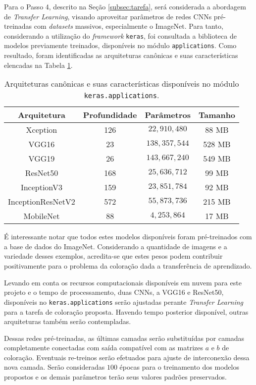 Para o Passo 4, descrito na Seção \ref{subsec:tarefa}, será considerada a abordagem de \emph{Transfer Learning}, visando aproveitar parâmetros de redes CNNs pré-treinadas com \emph{datasets} massivos, especialmente o ImageNet. Para tanto, considerando a utilização do \emph{framework} \texttt{keras}, foi consultada a biblioteca de modelos previamente treinados, disponíveis no módulo \texttt{applications}. Como resultado, foram identificadas as arquiteturas canônicas e suas características elencadas na Tabela \ref{tab:cnns}.

\begin{table}[!ht]
	\caption{Arquiteturas canônicas e suas características disponíveis no módulo \texttt{keras.applications}.}
	\centering
	\begin{tabular}{c c c c}
		\toprule
		 Arquitetura & Profundidade & Parâmetros & Tamanho \\
		\midrule
		Xception & 126 & $22,910,480$ & 88 MB \\
		VGG16 & 23 & $138,357,544$ & 528 MB \\
		VGG19 & 26 & $143,667,240$ & 549 MB \\
		ResNet50 & 168 & $25,636,712$ & 99 MB \\
		InceptionV3 & 159 & $23,851,784$ & 92 MB \\
		InceptionResNetV2 & 572 & $55,873,736$ & 215 MB \\
		MobileNet & 88 & $4,253,864$ & 17 MB \\
		\bottomrule
	\end{tabular}

	\label{tab:cnns}
\end{table}

É interessante notar que todos estes modelos disponíveis foram pré-treinados com a base de dados do ImageNet. Considerando a quantidade de imagens e a variedade desses exemplos, acredita-se que estes pesos podem contribuir positivamente para o problema da coloração dada a transferência de aprendizado.

Levando em conta os recursos computacionais disponíveis em nuvem para este projeto e o tempo de processamento, duas CNNs, a VGG16 e ResNet50, disponíveis no \texttt{keras.applications} serão ajustadas perante \emph{Transfer Learning} para a tarefa de coloração proposta. Havendo tempo posterior disponível, outras arquiteturas também serão contempladas.

Dessas redes pré-treinadas, as últimas camadas serão substituídas por camadas completamente conectadas com saída compatível com as matrizes $a$ e $b$ de coloração. Eventuais re-treinos serão efetuados para ajuste de interconexão dessa nova camada. Serão consideradas $100$ épocas para o treinamento dos modelos propostos e os demais parâmetros terão seus valores padrões preservados.
